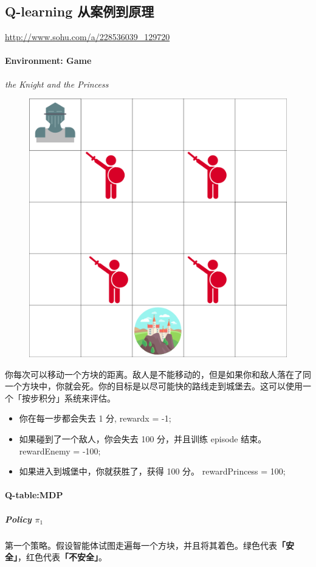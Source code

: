 \documentclass[UTF8,a4paper,12pt]{ctexbook}
\begin{document}
		\subsection{Q-learning 从案例到原理}	
			\url{http://www.sohu.com/a/228536039_129720}
			
			\paragraph{Environment: Game}
				\textit{the Knight and the Princess}
				
				\begin{figure}[H]
					\centering
					\includegraphics[width=.5\linewidth]{game01}
				\end{figure}
				
				你每次可以移动一个方块的距离。敌人是不能移动的，但是如果你和敌人落在了同一个方块中，你就会死。你的目标是以尽可能快的路线走到城堡去。这可以使用一个「按步积分」系统来评估。
				
				\begin{itemize}
					\item 你在每一步都会失去 1 分, rewardx = -1;
					\item 如果碰到了一个敌人，你会失去 100 分，并且训练 episode 结束。 rewardEnemy = -100;
					\item 如果进入到城堡中，你就获胜了，获得 100 分。 rewardPrincess = 100;
				\end{itemize}
				
				
			\paragraph{Q-table:MDP}
				\subparagraph{Policy $\pi_1$}
					第一个策略。假设智能体试图走遍每一个方块，并且将其着色。绿色代表\textbf{「安全」}，红色代表\textbf{「不安全」}。
					
\end{document}
